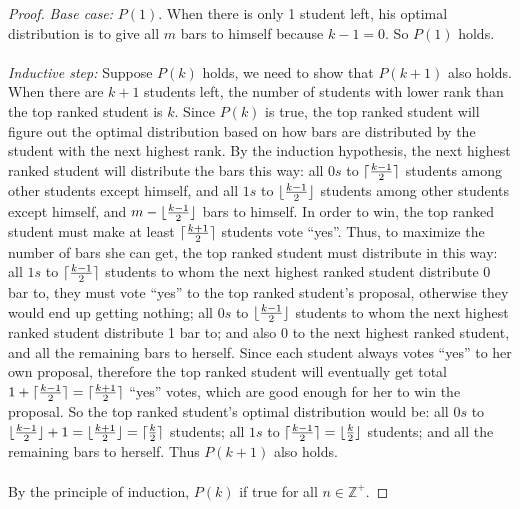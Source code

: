 \documentclass[11pt]{article}
\DeclarePairedDelimiter\ceil{\lceil}{\rceil}
\DeclarePairedDelimiter\floor{\lfloor}{\rfloor}
\begin{document}
\begin{proof}
  \emph{Base case:} $P(1)$. When there is only 1 student left, his
  optimal distribution is to give all $m$ bars to himself because
  $k-1=0$. So $P(1)$ holds.\\\\
  \emph{Inductive step:} Suppose $P(k)$ holds, we need to show that
  $P(k+1)$ also holds. When there are $k+1$ students left, the number
  of students with lower rank than the top ranked student is
  $k$. Since $P(k)$ is true, the top ranked student will figure out
  the optimal distribution based on how bars are distributed by the student
  with the next highest rank. By the induction hypothesis, the next
  highest ranked student will distribute the bars this way: all $0s$
  to $\ceil{\frac{k-1}{2}}$ students among other students except
  himself, and all $1s$ to $\floor{\frac{k-1}{2}}$
  students among other students except himself, and
  $m-\floor{\frac{k-1}{2}}$ bars to himself. In order to win,
  the top ranked student must make at least $\ceil{\frac{k+1}{2}}$
  students vote ``yes''. Thus, to maximize the number of bars she can
  get, the top ranked student must distribute in this way: all $1s$ to
  $\ceil{\frac{k-1}{2}}$ students to whom the next highest ranked
  student distribute 0 bar to, they must vote ``yes'' to the top
  ranked student's proposal, otherwise they would end up getting
  nothing; all $0s$ to $\floor{\frac{k-1}{2}}$ students to whom the
  next highest ranked student distribute 1 bar to; and also $0$ to the
  next highest ranked student, and all the remaining bars to
  herself. Since each student always votes ``yes'' 
  to her own proposal, therefore the top ranked student will eventually get
  total $1+\ceil{\frac{k-1}{2}} = \ceil{\frac{k+1}{2}}$ ``yes'' votes,
  which are good enough for her to win the proposal. So the top ranked
  student's optimal distribution would be: all $0s$ to
  $\floor{\frac{k-1}{2}} + 1 = \floor{\frac{k+1}{2}} =
  \ceil{\frac{k}{2}}$ students; all $1s$ to $\ceil{\frac{k-1}{2}} = 
  \floor{\frac{k}{2}}$ students; and all the remaining bars to
  herself. Thus $P(k+1)$ also holds. \\\\
  By the principle of induction, $P(k)$ if true for all $n \in
  \mathbb{Z}^+$.  
\end{proof}
\end{document}
